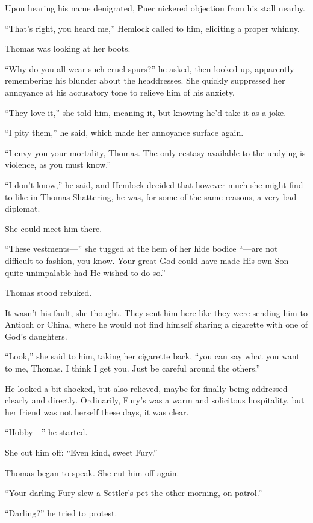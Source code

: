 \documentclass[11pt,a5paper]{article}
\begin{document}
Upon hearing his name denigrated, Puer nickered objection from his stall nearby.

``That's right, you heard me,'' Hemlock called to him, eliciting a proper whinny.

Thomas was looking at her boots.

``Why do you all wear such cruel spurs?'' he asked, then looked up, apparently remembering his blunder about the headdresses. She quickly suppressed her annoyance at his accusatory tone to relieve him of his anxiety.

``They love it,'' she told him, meaning it, but knowing he'd take it as a joke.

``I pity them,'' he said, which made her annoyance surface again.

``I envy you your mortality, Thomas. The only ecstasy available to the undying is violence, as you must know.''

``I don't know,'' he said, and Hemlock decided that however much she might find to like in Thomas Shattering, he was, for some of the same reasons, a very bad diplomat.

She could meet him there.

``These vestments---'' she tugged at the hem of her hide bodice ``---are not difficult to fashion, you know. Your great God could have made His own Son quite unimpalable had He wished to do so.''

Thomas stood rebuked.

It wasn't his fault, she thought. They sent him here like they were sending him to Antioch or China, where he would not find himself sharing a cigarette with one of God's daughters.

``Look,'' she said to him, taking her cigarette back, ``you can say what you want to me, Thomas. I think I get you. Just be careful around the others.''

He looked a bit shocked, but also relieved, maybe for finally being addressed clearly and directly. Ordinarily, Fury's was a warm and solicitous hospitality, but her friend was not herself these days, it was clear.

``Hobby---'' he started.

She cut him off: ``Even kind, sweet Fury.''

Thomas began to speak. She cut him off again.

``Your darling Fury slew a Settler's pet the other morning, on patrol.''

``Darling?'' he tried to protest.
\end{document}
